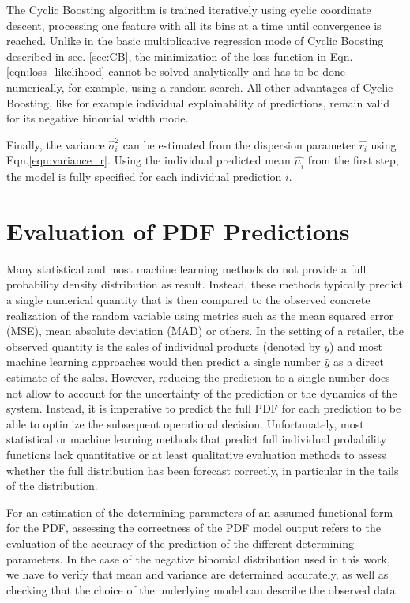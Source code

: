 \documentclass[BCOR=1mm, DIV=calc,10pt,
twoside=true,
twocolumn,
headings=normal]{scrartcl}
\newcommand{\eqn}{Eqn.}
\begin{document}
The Cyclic Boosting algorithm is trained iteratively using cyclic coordinate descent, processing one feature with all its bins at a time until convergence is reached. Unlike in the basic multiplicative regression mode of Cyclic Boosting described in sec. \ref{sec:CB}, the minimization of the loss function in \eqn \eqref{eqn:loss_likelihood} cannot be solved analytically and has to be done numerically, for example, using a random search. All other advantages of Cyclic Boosting, like for example individual explainability of predictions, remain valid for its negative binomial width mode.

Finally, the variance $\hat{\sigma}^2_i$ can be estimated from the dispersion parameter $\hat{r_i}$ using \eqn \eqref{eqn:variance_r}. Using  the individual predicted mean $\hat{\mu_i}$ from the first step, the model is fully specified for each individual prediction $i$.


\section{Evaluation of PDF Predictions}
\label{sec:pdfEvaluation}

Many statistical and most machine learning methods do not provide a full probability density distribution as result. Instead, these methods typically predict a single numerical quantity that is then compared to the observed concrete realization of the random variable using metrics such as the mean squared error (MSE), mean absolute deviation (MAD) or others. In the setting of a retailer, the observed quantity is the sales of individual products (denoted by $y$) and most machine learning approaches would then predict a single number $\hat{y}$ as a direct estimate of the sales. However, reducing the prediction to a single number does not allow to account for the uncertainty of the prediction or the dynamics of the system. Instead, it is imperative to predict the full PDF for each prediction to be able to optimize the subsequent operational decision. Unfortunately, most statistical or machine learning methods that predict full individual probability functions lack quantitative or at least qualitative evaluation methods to assess whether the full distribution has been forecast correctly, in particular in the tails of the distribution.

For an estimation of the determining parameters of an assumed functional form for the PDF, assessing the correctness of the PDF model output refers to the evaluation of the accuracy of the prediction of the different determining parameters. In the case of the negative binomial distribution used in this work, we have to verify that mean and variance are determined accurately, as well as checking that the choice of the underlying model can describe the observed data.
\end{document}
